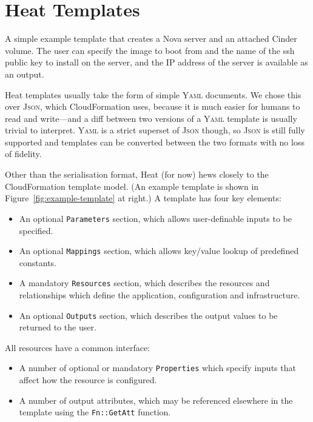 \section{Heat Templates}

\begin{marginfigure}

\caption{A simple example template that creates a Nova server and an attached Cinder volume. The user can specify the image to boot from and the name of the ssh public key to install on the server, and the IP address of the server is available as an output.}
\label{fig:example-template}
\end{marginfigure}

Heat templates usually take the form of simple \textsc{Yaml} documents. We chose this over \textsc{Json}, which CloudFormation uses, because it is much easier for humans to read and write---and a diff between two versions of a \textsc{Yaml} template is usually trivial to interpret. \textsc{Yaml} is a strict superset of \textsc{Json} though, so \textsc{Json} is still fully supported and templates can be converted between the two formats with no loss of fidelity.

Other than the serialisation format, Heat (for now) hews closely to the CloudFormation template model. (An example template is shown in Figure~\ref{fig:example-template} at right.) A template has four key elements:

\begin{itemize}
\item An optional \texttt{Parameters} section, which allows user-definable inputs to be specified.
\item An optional \texttt{Mappings} section, which allows key/value lookup of predefined constants.
\item A mandatory \texttt{Resources} section, which describes the resources and relationships which define the application, configuration and infrastructure.
\item An optional \texttt{Outputs} section, which describes the output values to be returned to the user.
\end{itemize}

All resources have a common interface:

\begin{itemize}
\item A number of optional or mandatory \texttt{Properties} which specify inputs that affect how the resource is configured.
\item A number of output attributes, which may be referenced elsewhere in the template using the \texttt{Fn::GetAtt} function.
\end{itemize}

